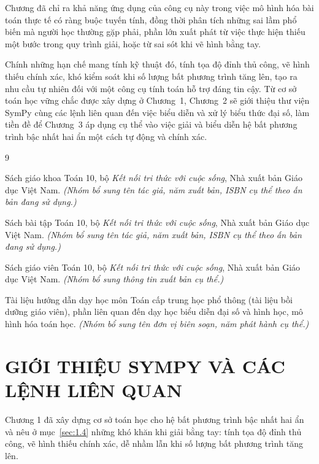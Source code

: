 \documentclass[12pt,a4paper]{report}
\begin{document}
Chương đã chỉ ra khả năng ứng dụng của công cụ này trong việc mô hình hóa bài toán thực tế có ràng buộc tuyến tính, đồng thời phân tích những sai lầm phổ biến mà người học thường gặp phải, phần lớn xuất phát từ việc thực hiện thiếu một bước trong quy trình giải, hoặc từ sai sót khi vẽ hình bằng tay.

Chính những hạn chế mang tính kỹ thuật đó, tính tọa độ đỉnh thủ công, vẽ hình thiếu chính xác, khó kiểm soát khi số lượng bất phương trình tăng lên, tạo ra nhu cầu tự nhiên đối với một công cụ tính toán hỗ trợ đáng tin cậy. Từ cơ sở toán học vững chắc được xây dựng ở Chương~1, Chương~2 sẽ giới thiệu thư viện SymPy cùng các lệnh liên quan đến việc biểu diễn và xử lý biểu thức đại số, làm tiền đề để Chương~3 áp dụng cụ thể vào việc giải và biểu diễn hệ bất phương trình bậc nhất hai ẩn một cách tự động và chính xác.

\begin{thebibliography}{9}

Sách giáo khoa Toán 10, bộ \emph{Kết nối tri thức với cuộc sống}, Nhà xuất bản Giáo dục Việt Nam. \emph{(Nhóm bổ sung tên tác giả, năm xuất bản, ISBN cụ thể theo ấn bản đang sử dụng.)}

Sách bài tập Toán 10, bộ \emph{Kết nối tri thức với cuộc sống}, Nhà xuất bản Giáo dục Việt Nam. \emph{(Nhóm bổ sung tên tác giả, năm xuất bản, ISBN cụ thể theo ấn bản đang sử dụng.)}

Sách giáo viên Toán 10, bộ \emph{Kết nối tri thức với cuộc sống}, Nhà xuất bản Giáo dục Việt Nam. \emph{(Nhóm bổ sung thông tin xuất bản cụ thể.)}

Tài liệu hướng dẫn dạy học môn Toán cấp trung học phổ thông (tài liệu bồi dưỡng giáo viên), phần liên quan đến dạy học biểu diễn đại số và hình học, mô hình hóa toán học. \emph{(Nhóm bổ sung tên đơn vị biên soạn, năm phát hành cụ thể.)}

\end{thebibliography}

\chapter{GIỚI THIỆU SYMPY VÀ CÁC LỆNH LIÊN QUAN}
\label{chap:sympy}

Chương 1 đã xây dựng cơ sở toán học cho hệ bất phương trình bậc nhất hai ẩn và nêu ở mục~\ref{sec:1.4} những khó khăn khi giải bằng tay: tính tọa độ đỉnh thủ công, vẽ hình thiếu chính xác, dễ nhầm lẫn khi số lượng bất phương trình tăng lên.
\end{document}
